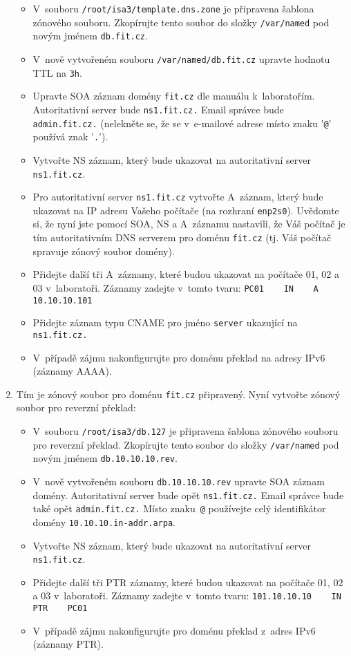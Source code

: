 \begin{enumerate}
    \begin{itemize}
      \item V~souboru {\tt /root/isa3/template.dns.zone} je připravena šablona zónového souboru.
            Zkopírujte tento soubor do složky {\tt /var/named} pod novým jménem {\tt db.fit.cz}.
      \item V~nově vytvořeném souboru {\tt /var/named/db.fit.cz} upravte hodnotu TTL na {\tt 3h}.
      \item Upravte SOA záznam domény {\tt fit.cz} dle manuálu k~laboratořím. Autoritativní server bude {\tt ns1.fit.cz.}
            Email správce bude {\tt admin.fit.cz.} (nelekněte se, že se v~e-mailové adrese místo znaku '{\tt @}' používá znak '{\tt .}').
      \item Vytvořte NS záznam, který bude ukazovat na autoritativní server {\tt ns1.fit.cz}.
      \item Pro autoritativní server {\tt ns1.fit.cz} vytvořte A~záznam, který bude ukazovat na IP adresu Vašeho počítače (na rozhraní {\tt enp2s0}).
            Uvědomte si, že nyní jste pomocí SOA, NS a A~záznamu nastavili, že Váš počítač je tím autoritativním DNS serverem pro doménu {\tt fit.cz} (tj. Váš počítač spravuje zónový soubor domény).
      \item Přidejte další tři A~záznamy, které budou ukazovat na počítače 01, 02 a 03 v~laboratoři. Záznamy zadejte v~tomto tvaru:
            \verb|PC01    IN    A    10.10.10.101|
      \item Přidejte záznam typu CNAME pro jméno {\tt server} ukazující na {\tt ns1.fit.cz.}
      \item V~případě zájmu nakonfigurujte pro doménu překlad na adresy IPv6 (záznamy AAAA).
    \end{itemize}
    
  \item Tím je zónový soubor pro doménu {\tt fit.cz} připravený. Nyní vytvořte zónový soubor pro reverzní překlad:
  
    \begin{itemize}
      \item V~souboru {\tt /root/isa3/db.127} je připravena šablona zónového souboru pro reverzní překlad.
            Zkopírujte tento soubor do složky {\tt /var/named} pod novým jménem {\tt db.10.10.10.rev}.
      \item V~nově vytvořeném souboru {\tt db.10.10.10.rev} upravte SOA záznam domény. Autoritativní server bude opět {\tt ns1.fit.cz.}
            Email správce bude také opět {\tt admin.fit.cz.} Místo znaku~{\tt @} používejte celý identifikátor domény {\tt 10.10.10.in-addr.arpa}.
      \item Vytvořte NS záznam, který bude ukazovat na autoritativní server {\tt ns1.fit.cz}.
      \item Přidejte další tři PTR záznamy, které budou ukazovat na počítače 01, 02 a 03 v~laboratoři. Záznamy zadejte v~tomto tvaru:
            \verb|101.10.10.10    IN    PTR    PC01|
      \item V~případě zájmu nakonfigurujte pro doménu překlad z~adres IPv6 (záznamy PTR).
    \end{itemize} 
    

\end{enumerate}
